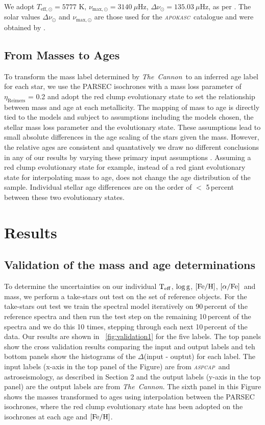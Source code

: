 \documentclass[12pt, preprint]{aastex}
\newcommand{\project}[1]{\textsl{#1}}
\newcommand{\tc}{\project{The~Cannon}}
\newcommand{\apokasc}{\project{\textsc{apokasc}}}
\newcommand{\aspcap}{\project{\textsc{aspcap}}}
\newcommand{\teff}{\mbox{$\rm T_{eff}$}}
\newcommand{\feh}{\mbox{$\rm [Fe/H]$}}
\newcommand{\alphafe}{\mbox{$\rm [\alpha/Fe]$}}
\newcommand{\logg}{\mbox{$\rm \log g$}}
\begin{document}
We adopt  $T_{\mathrm{eff,\odot}}=5777$ K, $\nu_{\mathrm{max,\odot}}=3140\ \mu$Hz, $\Delta \nu_{\odot}=135.03\ \mu$Hz, as per \citet{Martig2014}. The solar values  $\Delta \nu_{\odot}$ and $\nu_{\mathrm{max,\odot}}$ are those used for the \apokasc\ catalogue and were obtained by \cite{Hekker2013}.

\subsection{From Masses to Ages}

To transform the mass label determined by \tc\ to an inferred age label for each star, we use the PARSEC isochrones \citep{Bressan2012} with a mass loss parameter of $\eta_{\mbox{Reimers}}$ = 0.2 and adopt the red clump evolutionary state to set the relationship between mass and age at each metallicity.  The mapping of mass to age is directly tied to the models and subject to assumptions including the models chosen, the stellar mass loss parameter and the evolutionary state. These assumptions lead to small absolute differences in the age scaling of the stars given the mass. However,  the relative ages are consistent and quantatively we draw no different conclusions in any of our results by varying these primary input assumptions \citep[see also][]{Bovy2014}. Assuming a red clump evolutionary state for example, instead of a red giant evolutionary state for interpolating mass to age, does not change the age distribution of the sample. Individual stellar age differences are on the order of $<$ 5\,percent between these two evolutionary states. 

\section{Results}

\subsection{Validation of the mass and age determinations}

To determine the uncertainties on our individual \teff, \logg, \feh, \alphafe\ and mass, we perform a take-stars out test on the set of reference objects.
For the take-stars out test we train the spectral model iteratively on 90\,percent of the reference spectra and then run the test step on the remaining 10\,percent of the spectra and we do this 10 times, stepping through each next 10\,percent of the data. Our results are shown in \figurename~\ref{fig:validation1} for the five labels. The top panels show the cross validation results comparing the input and output labels and teh bottom panels show the histograms of the $\Delta$(input - ouptut) for each label. The input labels (x-axis in the top panel of the Figure) are from \aspcap\ and astroseismology, as described in Section 2 and the output labels (y-axis in the top panel) are the output labels are from \tc.  The sixth panel in this Figure shows the masses transformed to ages using interpolation between the PARSEC isochrones, where the red clump evolutionary state has been adopted on the isochrones at each age and \feh. 
\end{document}
